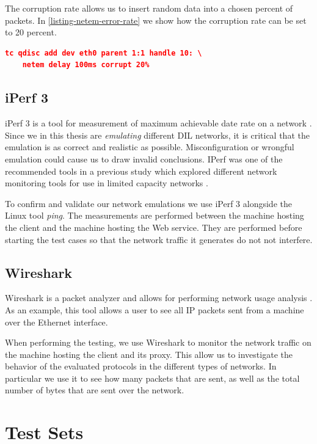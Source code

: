The corruption rate allows us to insert random data into a chosen percent of
packets. In \cref{listing-netem-error-rate} we show how the corruption rate can
be set to 20 percent.

\begin{lstlisting}[frame=single, language=json, caption="Emulating the corruption rate", label=listing-netem-error-rate]
  tc qdisc add dev eth0 parent 1:1 handle 10: \
    netem delay 100ms corrupt 20%
\end{lstlisting}


\subsection{iPerf 3}

iPerf 3 is a tool for measurement of maximum achievable date rate on a network
\cite{iperf3-homepage}. Since we in this thesis are \textit{emulating} different
DIL networks, it is critical that the emulation is as correct and realistic as
possible. Misconfiguration or wrongful emulation could cause us to draw invalid
conclusions. IPerf was one of the recommended tools in a previous study which
explored different network monitoring tools for use in limited capacity
networks \cite{bloebaum-monitoring}.

To confirm and validate our network emulations we use iPerf 3 alongside the
Linux tool \textit{ping}. The measurements are performed between the machine
hosting the client and the machine hosting the Web service. They are performed
before starting the test cases so that the network traffic it generates do not
not interfere.


\subsection{Wireshark}

Wireshark is a packet analyzer and allows for performing network usage analysis
\cite{wireshark-homepage}. As an example, this tool allows a user to see all IP
packets sent from a machine over the Ethernet interface.

When performing the testing, we use Wireshark to monitor the network traffic on
the machine hosting the client and its proxy. This allow us to investigate the
behavior of the evaluated protocols in the different types of networks. In
particular we use it to see how many packets that are sent, as well as the
total number of bytes that are sent over the network.


\section{Test Sets}

